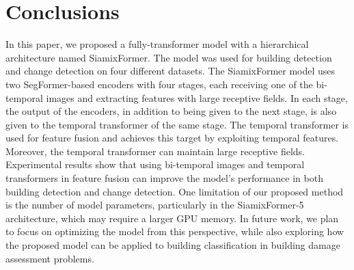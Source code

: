 \documentclass{article}
\begin{document}
\section{Conclusions}           
\label{sec4}
In this paper, we proposed a fully-transformer model with a hierarchical architecture named SiamixFormer. The model was used for building detection and change detection on four different datasets. The SiamixFormer model uses two SegFormer-based encoders with four stages, each receiving one of the bi-temporal images and extracting features with large receptive fields. In each stage, the output of the encoders, in addition to being given to the next stage, is also given to the temporal transformer of the same stage. The temporal transformer is used for feature fusion and achieves this target by exploiting temporal features. Moreover, the temporal transformer can maintain large receptive fields. Experimental results show that using bi-temporal images and temporal transformers in feature fusion can improve the model's performance in both building detection and change detection. One limitation of our proposed method is the number of model parameters, particularly in the SiamixFormer-5 architecture, which may require a larger GPU memory. In future work, we plan to focus on optimizing the model from this perspective, while also exploring how the proposed model can be applied to building classification in building damage assessment problems.


  
  
\end{document}
